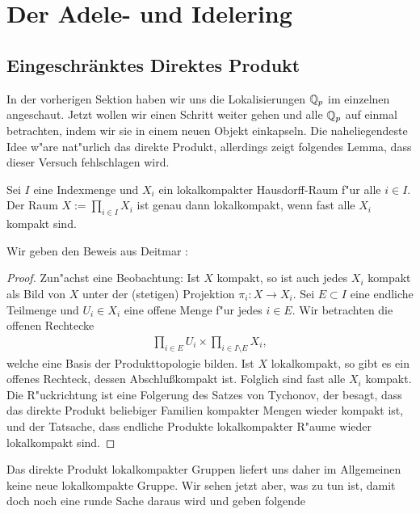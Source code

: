\section{Der Adele- und Idelering}
	
	\subsection{Eingeschränktes Direktes Produkt}
		In der vorherigen Sektion haben wir uns die Lokalisierungen $\mathbb{Q}_p$ im einzelnen angeschaut. Jetzt wollen wir einen Schritt weiter gehen und alle $\mathbb{Q}_p$ auf einmal betrachten, indem wir sie in einem neuen Objekt einkapseln. Die naheliegendeste Idee w"are nat"urlich das direkte Produkt, allerdings zeigt folgendes Lemma, dass dieser Versuch fehlschlagen wird.
		\begin{lemma}\label{Lemma:lokalkompaktProd}
			Sei $I$ eine Indexmenge und $X_i$ ein lokalkompakter Hausdorff-Raum f"ur alle $i \in I$. Der Raum $X:=\prod_{i \in I} X_i$ ist genau dann lokalkompakt, wenn fast alle $X_i$ kompakt sind.
		\end{lemma}
		Wir geben den Beweis aus Deitmar \cite{deitmar2010}:
		\begin{proof}
			Zun"achst eine Beobachtung: Ist $X$ kompakt, so ist auch jedes $X_i$ kompakt als Bild von $X$ unter der (stetigen) Projektion $\pi_i:X \to X_i$.
			Sei $E \subset I$ eine endliche Teilmenge und $U_i \in X_i$ eine offene Menge f"ur jedes $i \in E$. Wir betrachten die offenen Rechtecke
			\begin{align*}
				\prod_{i \in E} U_i \times \prod_{i \in I\setminus E} X_i,
			\end{align*}
			welche eine Basis der Produkttopologie bilden. Ist $X$ lokalkompakt, so gibt es ein offenes Rechteck, dessen Abschlu\ss kompakt ist. Folglich sind fast alle $X_i$ kompakt. Die R"uckrichtung ist eine Folgerung des Satzes von Tychonov, der besagt, dass das direkte Produkt beliebiger Familien kompakter Mengen wieder kompakt ist, und der Tatsache, dass endliche Produkte lokalkompakter R"aume wieder lokalkompakt sind.
		\end{proof}
		Das direkte Produkt lokalkompakter Gruppen liefert uns daher im Allgemeinen keine neue lokalkompakte Gruppe. Wir sehen jetzt aber, was zu tun ist, damit doch noch eine runde Sache daraus wird und geben folgende
